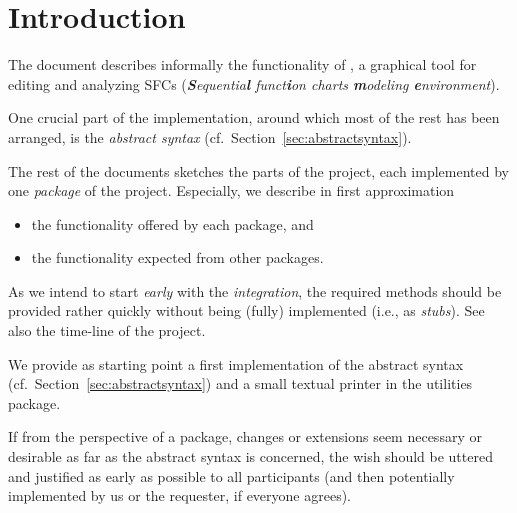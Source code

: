 \section{Introduction}
\label{sec:introduction}

The document describes informally the functionality of \Slime, a graphical
tool for editing and analyzing SFCs (\textit{\textbf{S}equentia\textbf{l}
  funct\textbf{i}on charts \textbf{m}odeling \textbf{e}nvironment}).


One crucial part of the implementation, around which most of the rest has
been arranged, is the \emph{abstract syntax} (cf.\ 
Section~\ref{sec:abstractsyntax}).


The rest of the documents sketches the parts of the project, each
implemented by one \emph{package} of the project. Especially, we describe
in first approximation
\begin{itemize}
\item the functionality offered by each package, and
\item the functionality expected from other packages.
\end{itemize}


As we intend to start \emph{early} with the \emph{integration}, the
required methods should be provided rather quickly without being (fully)
implemented (i.e., as \textit{stubs}). See also the time-line of the
project.

We provide as starting point a first implementation of the abstract syntax
(cf.\ Section~\ref{sec:abstractsyntax}) and a small textual printer in the
utilities package.



If from the perspective of a package, changes or extensions seem necessary
or desirable as far as the abstract syntax is concerned, the wish should be
uttered and justified as early as possible to all participants (and then
potentially implemented by us or the requester, if everyone agrees).

